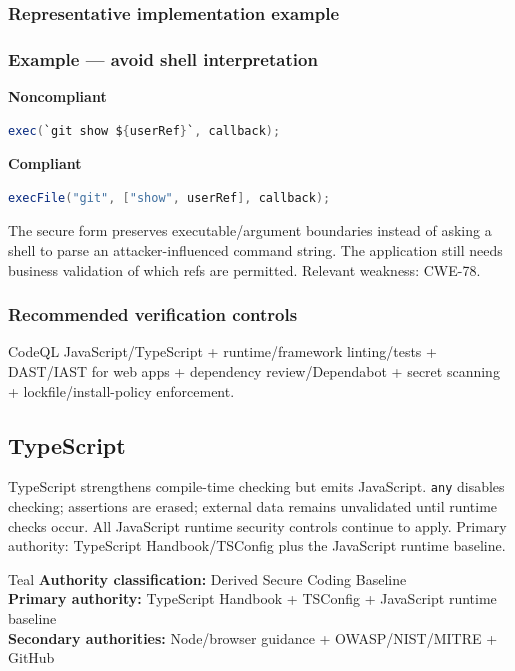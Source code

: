 \documentclass[10pt,letterpaper]{article}
\newcommand{\code}[1]{\texttt{\small #1}}
\begin{document}
\subsubsection*{Representative implementation example}
\subsubsection*{Example --- avoid shell interpretation}

\textbf{Noncompliant}\par
\begin{lstlisting}[language={Java}]
exec(`git show ${userRef}`, callback);
\end{lstlisting}

\textbf{Compliant}\par
\begin{lstlisting}[language={Java}]
execFile("git", ["show", userRef], callback);
\end{lstlisting}

The secure form preserves executable/argument boundaries instead of asking a shell to parse an attacker-influenced command string. The application still needs business validation of which refs are permitted. Relevant weakness: CWE-78.\par
\subsubsection*{Recommended verification controls}
CodeQL JavaScript/TypeScript + runtime/framework linting/tests + DAST/IAST for web apps + dependency review/Dependabot + secret scanning + lockfile/install-policy enforcement.
\clearpage
\subsection{TypeScript}
TypeScript strengthens compile-time checking but emits JavaScript. \code{any} disables checking; assertions are erased; external data remains unvalidated until runtime checks occur. All JavaScript runtime security controls continue to apply. Primary authority: TypeScript Handbook/TSConfig plus the JavaScript runtime baseline.
\begin{callout}{Teal}
\textbf{Authority classification:} Derived Secure Coding Baseline\\
\textbf{Primary authority:} TypeScript Handbook + TSConfig + JavaScript runtime baseline\\
\textbf{Secondary authorities:} Node/browser guidance + OWASP/NIST/MITRE + GitHub
\end{callout}
\end{document}
